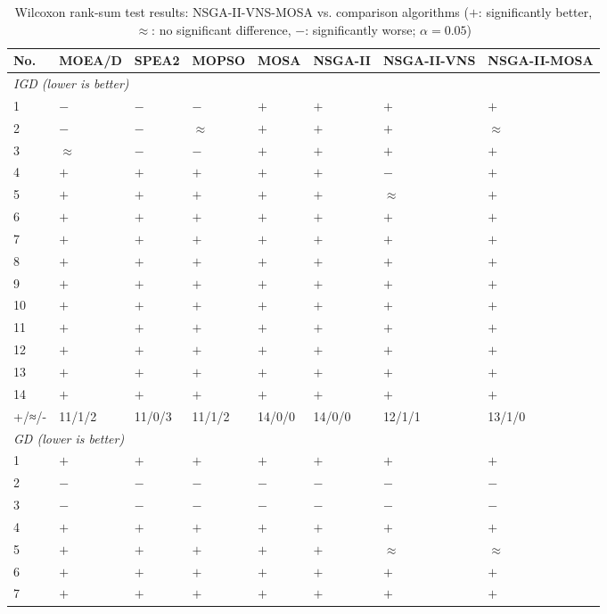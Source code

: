 \begin{table}[htbp]
\centering
\caption{Wilcoxon rank-sum test results: NSGA-II-VNS-MOSA vs. comparison algorithms ($+$: significantly better, $\approx$: no significant difference, $-$: significantly worse; $\alpha=0.05$)}
\label{tab:wilcoxon}
\begin{tabular}{llllllll}
\hline
No. & MOEA/D & SPEA2 & MOPSO & MOSA & NSGA-II & NSGA-II-VNS & NSGA-II-MOSA \\
\hline
\multicolumn{8}{l}{\textit{IGD (lower is better)}} \\
1 & $-$ & $-$ & $-$ & $+$ & $+$ & $+$ & $+$ \\
2 & $-$ & $-$ & $\approx$ & $+$ & $+$ & $+$ & $\approx$ \\
3 & $\approx$ & $-$ & $-$ & $+$ & $+$ & $+$ & $+$ \\
4 & $+$ & $+$ & $+$ & $+$ & $+$ & $-$ & $+$ \\
5 & $+$ & $+$ & $+$ & $+$ & $+$ & $\approx$ & $+$ \\
6 & $+$ & $+$ & $+$ & $+$ & $+$ & $+$ & $+$ \\
7 & $+$ & $+$ & $+$ & $+$ & $+$ & $+$ & $+$ \\
8 & $+$ & $+$ & $+$ & $+$ & $+$ & $+$ & $+$ \\
9 & $+$ & $+$ & $+$ & $+$ & $+$ & $+$ & $+$ \\
10 & $+$ & $+$ & $+$ & $+$ & $+$ & $+$ & $+$ \\
11 & $+$ & $+$ & $+$ & $+$ & $+$ & $+$ & $+$ \\
12 & $+$ & $+$ & $+$ & $+$ & $+$ & $+$ & $+$ \\
13 & $+$ & $+$ & $+$ & $+$ & $+$ & $+$ & $+$ \\
14 & $+$ & $+$ & $+$ & $+$ & $+$ & $+$ & $+$ \\
\hline
+/≈/- & 11/1/2 & 11/0/3 & 11/1/2 & 14/0/0 & 14/0/0 & 12/1/1 & 13/1/0 \\
\hline
\multicolumn{8}{l}{\textit{GD (lower is better)}} \\
1 & $+$ & $+$ & $+$ & $+$ & $+$ & $+$ & $+$ \\
2 & $-$ & $-$ & $-$ & $-$ & $-$ & $-$ & $-$ \\
3 & $-$ & $-$ & $-$ & $-$ & $-$ & $-$ & $-$ \\
4 & $+$ & $+$ & $+$ & $+$ & $+$ & $+$ & $+$ \\
5 & $+$ & $+$ & $+$ & $+$ & $+$ & $\approx$ & $\approx$ \\
6 & $+$ & $+$ & $+$ & $+$ & $+$ & $+$ & $+$ \\
7 & $+$ & $+$ & $+$ & $+$ & $+$ & $+$ & $+$ \\

\end{tabular}
\end{table}
